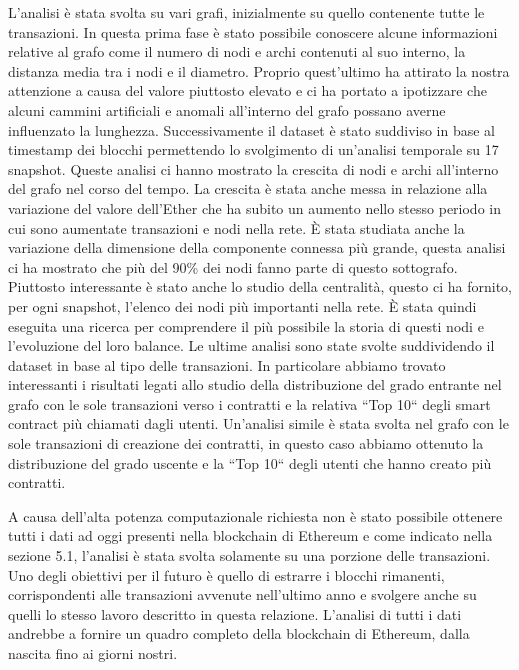 \documentclass[12pt]{report}
\begin{document}
L'analisi è stata svolta su vari grafi, inizialmente su quello contenente tutte le transazioni.
In questa prima fase è stato possibile conoscere alcune informazioni relative al grafo come il numero di nodi e archi contenuti al suo interno, la distanza media tra i nodi e il diametro. Proprio quest'ultimo ha attirato la nostra attenzione a causa del valore piuttosto elevato e ci ha portato a ipotizzare che alcuni cammini artificiali e anomali all'interno del grafo possano averne influenzato la lunghezza.
Successivamente il dataset è stato suddiviso in base al timestamp dei blocchi permettendo lo svolgimento di un'analisi temporale su 17 snapshot.
Queste analisi ci hanno mostrato la crescita di nodi e archi all'interno del grafo nel corso del tempo. La crescita è stata anche messa in relazione alla variazione del valore dell'Ether che ha subito un aumento nello stesso periodo in cui sono aumentate transazioni e nodi nella rete.
È stata studiata anche la variazione della dimensione della componente connessa più grande, questa analisi ci ha mostrato che più del 90\% dei nodi fanno parte di questo sottografo.
Piuttosto interessante è stato anche lo studio della centralità, questo ci ha fornito, per ogni snapshot, l'elenco dei nodi più importanti nella rete. È stata quindi eseguita una ricerca per comprendere il più possibile la storia di questi nodi e l'evoluzione del loro balance.
\newline Le ultime analisi sono state svolte suddividendo il dataset in base al tipo delle transazioni. In particolare abbiamo trovato interessanti i risultati legati allo studio della distribuzione del grado entrante nel grafo con le sole transazioni verso i contratti e la relativa ``Top 10`` degli smart contract più chiamati dagli utenti.
Un'analisi simile è stata svolta nel grafo con le sole transazioni di creazione dei contratti, in questo caso abbiamo ottenuto la distribuzione del grado uscente e la ``Top 10`` degli utenti che hanno creato più contratti.

A causa dell'alta potenza computazionale richiesta non è stato possibile ottenere tutti i dati ad oggi presenti nella blockchain di Ethereum e come indicato nella sezione 5.1, l'analisi è stata svolta solamente su una porzione delle transazioni.
\newline 
Uno degli obiettivi per il futuro è quello di estrarre i blocchi rimanenti, corrispondenti alle transazioni avvenute nell'ultimo anno e svolgere anche su quelli lo stesso lavoro descritto in questa relazione.
L'analisi di tutti i dati andrebbe a fornire un quadro completo della blockchain di Ethereum, dalla nascita fino ai giorni nostri.
\end{document}
